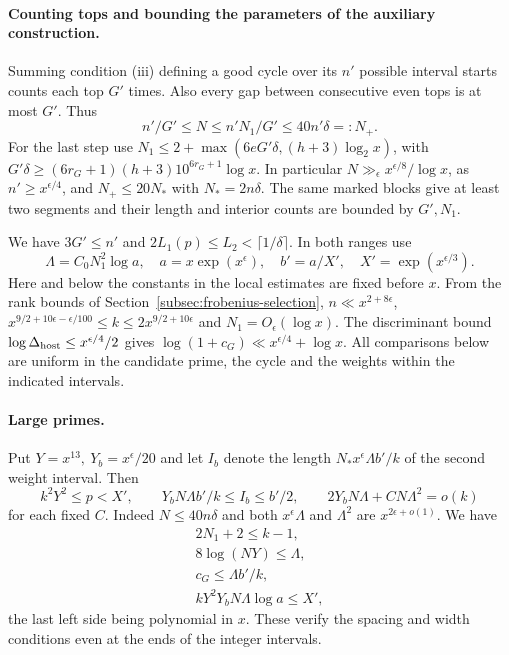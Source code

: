 \paragraph{Counting tops and bounding the parameters of the auxiliary construction.}
Summing condition (iii) defining a good cycle over its \(n'\)
possible interval starts counts each top \(G'\) times. Also every
gap between consecutive even tops is at most \(G'\). Thus
\[
 n'/G'\le N\le n'N_1/G'\le 40n'\delta=:N_+ .
\]
For the last step use
\(N_1\le2+\max(6eG'\delta,(h+3)\log_2 x)\), with
\(G'\delta\ge (6r_G+1)(h+3)10^{6r_G+1}\log x\).
In particular \(N\gg_\epsilon x^{\epsilon/8}/\log x\),
as \(n'\ge x^{\epsilon/4}\), and \(N_+\le20N_*\) with
\(N_*=2n\delta\). The same marked blocks give at least two
segments and their length and interior counts are bounded by
\(G',N_1\).

We have \(3G'\le n'\) and
\(2L_1(p)\le L_2<\lceil1/\delta\rceil\).
In both ranges use
\[
 \Lambda=C_0 N_1^2\log a,\quad a=x\exp(x^\epsilon),
 \quad b'=a/X',\quad X'=\exp(x^{\epsilon/3}).
\]
Here and below the constants in the local estimates are fixed
before \(x\). From the rank bounds of
Section~\ref{subsec:frobenius-selection}, \(n\ll x^{2+8\epsilon}\),
\(x^{9/2+10\epsilon-\epsilon/100}\le k\le2x^{9/2+10\epsilon}\)
and \(N_1=O_\epsilon(\log x)\). The discriminant bound
\(\log\Delta_{\rm host}\le x^{\epsilon/4}/2\) gives
\(\log(1+c_G)\ll x^{\epsilon/4}+\log x\).
All comparisons below are uniform in the candidate prime, the
cycle and the weights within the indicated intervals.

\paragraph{Large primes.}
Put \(Y=x^{13},\ Y_b=x^\epsilon/20\) and let \(I_b\)
denote the length \(N_* x^\epsilon\Lambda b'/k\) of the
second weight interval. Then
\[
 k^2Y^2\le p<X',\qquad
 Y_bN\Lambda b'/k\le I_b\le b'/2,\qquad
 2Y_bN\Lambda+C N\Lambda^2=o(k)
\]
for each fixed \(C\). Indeed \(N\le40n\delta\) and both
\(x^\epsilon\Lambda\) and \(\Lambda^2\) are
\(x^{2\epsilon+o(1)}\).
We have \[
 \begin{gathered}
 2N_1+2\le k-1, \\ 8\log(NY)\le\Lambda, \\ c_G\le\Lambda b'/k, \\ kY^2Y_bN\Lambda\log a\le X',
\end{gathered}
\] the last left side being
polynomial in \(x\). These verify the spacing and width
conditions even at the ends of the integer intervals.

